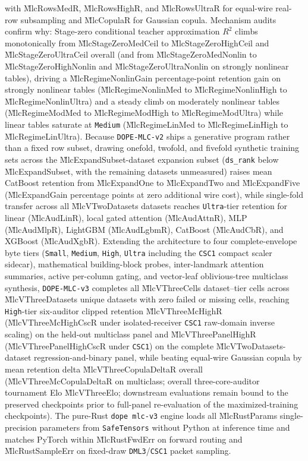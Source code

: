 with \G{MlcRowsMedR}, \G{MlcRowsHighR}, and \G{MlcRowsUltraR} for equal-wire real-row subsampling and
\G{MlcCopulaR} for Gaussian copula. Mechanism audits confirm why: Stage-zero conditional teacher
approximation $R^2$ climbs monotonically from \G{MlcStageZeroMedCeil} to \G{MlcStageZeroHighCeil} and
\G{MlcStageZeroUltraCeil} overall (and from \G{MlcStageZeroMedNonlin} to \G{MlcStageZeroHighNonlin} and
\G{MlcStageZeroUltraNonlin} on strongly nonlinear tables), driving a \G{MlcRegimeNonlinGain}
percentage-point retention gain on strongly nonlinear tables (\G{MlcRegimeNonlinMed} to
\G{MlcRegimeNonlinHigh} to \G{MlcRegimeNonlinUltra}) and a steady climb on moderately nonlinear tables
(\G{MlcRegimeModMed} to \G{MlcRegimeModHigh} to \G{MlcRegimeModUltra}) while linear tables saturate at
\texttt{Medium} (\G{MlcRegimeLinMed} to \G{MlcRegimeLinHigh} to \G{MlcRegimeLinUltra}). Because
\texttt{DOPE-MLC-v2} ships a generative program rather than a fixed row subset, drawing onefold,
twofold, and fivefold synthetic training sets across the \G{MlcExpandSubset}-dataset expansion subset
(\texttt{ds\_rank} below \G{MlcExpandSubset}, with the remaining datasets unmeasured) raises mean
CatBoost retention from \G{MlcExpandOne} to \G{MlcExpandTwo} and \G{MlcExpandFive} (\G{MlcExpandGain}
percentage points at zero additional wire cost), while single-fold transfer across all \G{MlcVTwoDatasets}
datasets reaches \texttt{Ultra}-tier retention for linear (\G{MlcAudLinR}), local
gated attention (\G{MlcAudAttnR}), MLP (\G{MlcAudMlpR}), LightGBM (\G{MlcAudLgbmR}), CatBoost
(\G{MlcAudCbR}), and XGBoost (\G{MlcAudXgbR}). Extending the
architecture to four complete-envelope byte tiers (\texttt{Small}, \texttt{Medium}, \texttt{High},
\texttt{Ultra} including the \texttt{CSC1} compact scaler sidecar), mathematical building-block
probes, inter-landmark attention summaries, active per-column gating, and vector-leaf oblivious-tree
multiclass synthesis, \texttt{DOPE-MLC-v3} completes all \G{MlcVThreeCells} dataset--tier cells across
\G{MlcVThreeDatasets} unique datasets with zero failed or missing cells, reaching \texttt{High}-tier
six-auditor clipped retention \G{MlcVThreeMcHighR} (\G{MlcVThreeMcHighCscR} under isolated-receiver
\texttt{CSC1} raw-domain inverse scaling) on the held-out multiclass panel and
\G{MlcVThreePanelHighR} (\G{MlcVThreePanelHighCscR} under \texttt{CSC1}) on the complete
\G{MlcVTwoDatasets}-dataset regression-and-binary panel, while beating equal-wire Gaussian copula by
mean retention delta \G{MlcVThreeCopulaDeltaR} overall (\G{MlcVThreeMcCopulaDeltaR} on multiclass;
overall three-core-auditor tournament Elo \G{MlcVThreeElo}; downstream evaluations remain bound to the
preserved checkpoints prior to full-panel re-evaluation of the maximized-training checkpoints). The
pure-Rust \texttt{dope mlc-v3}
engine loads all \G{MlcRustParams} single-precision parameters from \texttt{SafeTensors} without
Python at inference time and matches PyTorch within \G{MlcRustFwdErr} on forward routing and
\G{MlcRustSampleErr} on fixed-draw \texttt{DML3}/\texttt{CSC1} packet sampling.

